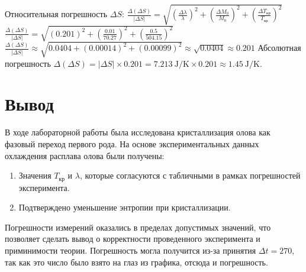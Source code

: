 \documentclass[a4paper]{article}
\begin{document}
Относительная погрешность $\Delta S$:
$\frac{\Delta (\Delta S)}{|\Delta S|} = \sqrt{ \left(\frac{\Delta \lambda}{\lambda}\right)^2 + \left(\frac{\Delta M_0}{M_0}\right)^2 + \left(\frac{\Delta T_{кр}}{T_{кр}}\right)^2 }$
$\frac{\Delta (\Delta S)}{|\Delta S|} = \sqrt{ (0.201)^2 + \left(\frac{0.01}{70.27}\right)^2 + \left(\frac{0.5}{504.15}\right)^2 }$
$\frac{\Delta (\Delta S)}{|\Delta S|} \approx \sqrt{ 0.0404 + (0.00014)^2 + (0.00099)^2 } \approx \sqrt{0.0404} \approx 0.201$
Абсолютная погрешность $\Delta (\Delta S) = |\Delta S| \times 0.201 = \SI{7.213}{\joule\per\kelvin} \times 0.201 \approx \SI{1.45}{\joule\per\kelvin}$.

\section{\textbf{Вывод}}

В ходе лабораторной работы была исследована кристаллизация олова как фазовый переход первого рода. На основе экспериментальных данных охлаждения расплава олова были получены: 
\begin{enumerate}
\item Значения $T_{кр}$ и $\lambda$, которые согласуются с табличными в рамках погрешностей эксперимента. 
\item Подтверждено уменьшение энтропии при кристаллизации. 
\end{enumerate}
Погрешности измерений оказались в пределах допустимых значений, что позволяет сделать вывод о корректности проведенного эксперимента и приминимости теории. Погрешность могла получится из-за принятия $\Delta t = 270$, так как это число было взято на глаз из графика, отсюда и погрешность. 
\end{document}
